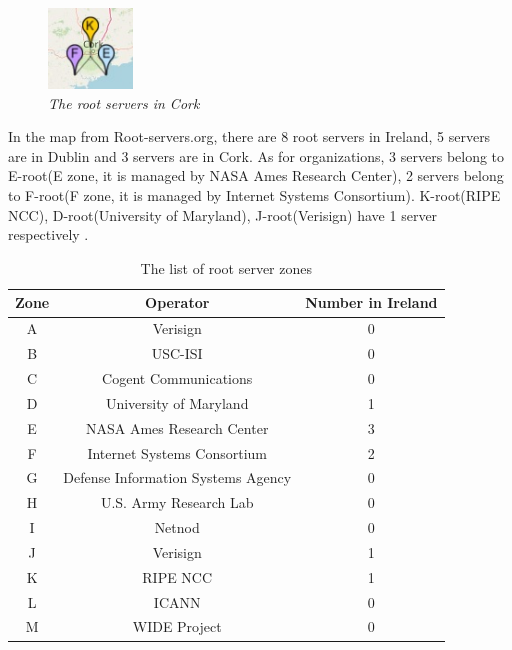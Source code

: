 \documentclass[conference]{IEEEtran}
\begin{document}
\begin{figure}[hbt!]  
    \centering
    \includegraphics[width=0.20\textwidth]{figure/root-server-map-cork.jpg}
    \caption{\em The root servers in Cork \cite{root_servers_org} \label{fig:root_servers_cork}}
\end{figure}

In the map from Root-servers.org, there are 8 root servers in Ireland, 5 servers are in Dublin and 3 servers are in Cork. As for organizations, 3 servers belong to E-root(E zone, it is managed by NASA Ames Research Center), 2 servers belong to F-root(F zone, it is managed by Internet Systems Consortium). K-root(RIPE NCC), D-root(University of Maryland), J-root(Verisign) have 1 server respectively \cite{root_servers_org}.
\\

\begin{table}[hbt!]
    \centering
    \begin{tabular}{|c|c|c|}
        \hline
          Zone & Operator & Number in Ireland\\    
        \hline
        A & Verisign & 0 \\
        \hline
        B & USC-ISI & 0\\
        \hline
        C & Cogent Communications & 0 \\
        \hline
        D & University of Maryland & 1\\
        \hline
        E & NASA Ames Research Center & 3\\
        \hline
        F & Internet Systems Consortium & 2\\
        \hline
        G & Defense Information Systems Agency & 0\\
        \hline
        H & U.S. Army Research Lab & 0\\
        \hline
        I & Netnod & 0\\
        \hline
        J & Verisign & 1\\
        \hline
        K & RIPE NCC & 1\\
        \hline
        L & ICANN & 0\\
        \hline
        M & WIDE Project & 0\\
        \hline
    \end{tabular}
    \caption{The list of root server zones \cite{root_servers_org}}
    \label{tab:root_server_zone_list}
\end{table}
\end{document}
